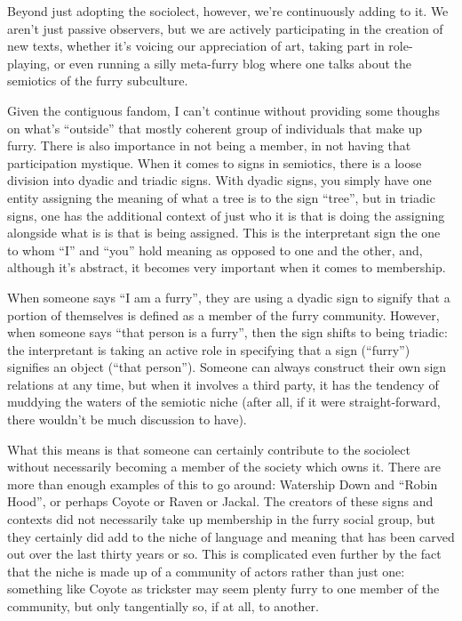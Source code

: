 Beyond just adopting the sociolect, however, we're continuously adding to it. We aren't just passive observers, but we are actively participating in the creation of new texts, whether it's voicing our appreciation of art, taking part in role-playing, or even running a silly meta-furry blog where one talks about the semiotics of the furry subculture.

Given the contiguous fandom, I can't continue without providing some thoughs on what's ``outside'' that mostly coherent group of individuals that make up furry. There is also importance in not being a member, in not having that participation mystique. When it comes to signs in semiotics, there is a loose division into dyadic and triadic signs. With dyadic signs, you simply have one entity assigning the meaning of what a tree is to the sign ``tree'', but in triadic signs, one has the additional context of just who it is that is doing the assigning alongside what is is that is being assigned. This is the interpretant sign the one to whom ``I'' and ``you'' hold meaning as opposed to one and the other, and, although it's abstract, it becomes very important when it comes to membership.

When someone says ``I am a furry'', they are using a dyadic sign to signify that a portion of themselves is defined as a member of the furry community. However, when someone says ``that person is a furry'', then the sign shifts to being triadic: the interpretant is taking an active role in specifying that a sign (``furry'') signifies an object (``that person''). Someone can always construct their own sign relations at any time, but when it involves a third party, it has the tendency of muddying the waters of the semiotic niche (after all, if it were straight-forward, there wouldn't be much discussion to have).

What this means is that someone can certainly contribute to the sociolect without necessarily becoming a member of the society which owns it. There are more than enough examples of this to go around: Watership Down and ``Robin Hood'', or perhaps Coyote or Raven or Jackal. The creators of these signs and contexts did not necessarily take up membership in the furry social group, but they certainly did add to the niche of language and meaning that has been carved out over the last thirty years or so. This is complicated even further by the fact that the niche is made up of a community of actors rather than just one: something like Coyote as trickster may seem plenty furry to one member of the community, but only tangentially so, if at all, to another.

